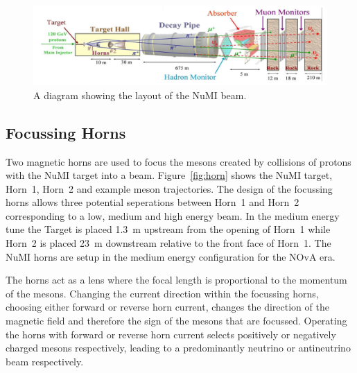 
\begin{figure}
  \centering
  \includegraphics[width=1\textwidth]{../../img/beam/beam_diagram.png} 
  \caption{A diagram showing the layout of the NuMI beam. \cite{NuMI}}
  \label{fig:NuMI}
\end{figure}

\subsection{Focussing Horns}

Two magnetic horns are used to focus the mesons created 
by collisions of protons with the NuMI target into a
beam. Figure~\ref{fig:horn} shows the NuMI target, Horn~1, Horn~2 and
example meson trajectories. 
The design of the focussing horns allows three potential seperations
between 
Horn~1 and Horn~2 corresponding to a low, medium and high
energy beam. 
In the medium energy tune the Target is placed 1.3~m upstream from the
opening of Horn~1 while 
Horn~2 is placed 23~m downstream relative to the front face of Horn~1.
The NuMI horns are setup in the medium energy configuration
for the NOvA era.

The horns act as a lens where the focal
length is proportional to the momentum of the mesons.
Changing the current
direction within the focussing horns, choosing either forward or
reverse horn current, changes the direction of
the magnetic field and therefore the sign
of the mesons that are focussed. Operating the horns with forward or
reverse horn current selects positively or negatively charged mesons
respectively, leading to a predominantly neutrino or antineutrino beam
respectively. 

